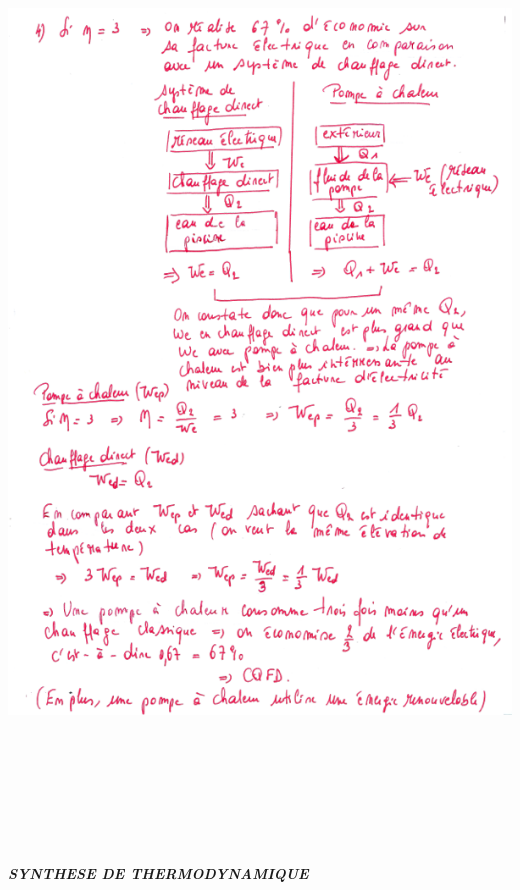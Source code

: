 \includegraphics[width=18.251cm,height=25.591cm]{Pictures/1000000100000253000003439D3D805CCD33A9FD.png}

\emph{\textbf{SYNTHESE DE THERMODYNAMIQUE}}

